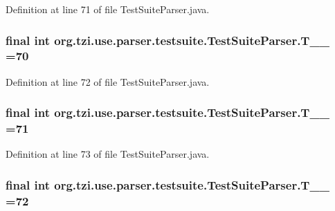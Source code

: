 Definition at line 71 of file Test\-Suite\-Parser.\-java.

\hypertarget{classorg_1_1tzi_1_1use_1_1parser_1_1testsuite_1_1_test_suite_parser_a0ce1b38ec15d81f404dbc935c9394cd3}{
\subsubsection[{T\-\_\-\-\_\-70}]{\setlength{\rightskip}{0pt plus 5cm}final int org.\-tzi.\-use.\-parser.\-testsuite.\-Test\-Suite\-Parser.\-T\-\_\-\-\_ =70\hspace{0.3cm}{\ttfamily [static]}}}\label{classorg_1_1tzi_1_1use_1_1parser_1_1testsuite_1_1_test_suite_parser_a0ce1b38ec15d81f404dbc935c9394cd3}


Definition at line 72 of file Test\-Suite\-Parser.\-java.

\hypertarget{classorg_1_1tzi_1_1use_1_1parser_1_1testsuite_1_1_test_suite_parser_a9903e3d5b461bff347486cb02d4a945e}{
\subsubsection[{T\-\_\-\-\_\-71}]{\setlength{\rightskip}{0pt plus 5cm}final int org.\-tzi.\-use.\-parser.\-testsuite.\-Test\-Suite\-Parser.\-T\-\_\-\-\_ =71\hspace{0.3cm}{\ttfamily [static]}}}\label{classorg_1_1tzi_1_1use_1_1parser_1_1testsuite_1_1_test_suite_parser_a9903e3d5b461bff347486cb02d4a945e}


Definition at line 73 of file Test\-Suite\-Parser.\-java.

\hypertarget{classorg_1_1tzi_1_1use_1_1parser_1_1testsuite_1_1_test_suite_parser_a76d3af36b56ea1386f613f98a185f88f}{
\subsubsection[{T\-\_\-\-\_\-72}]{\setlength{\rightskip}{0pt plus 5cm}final int org.\-tzi.\-use.\-parser.\-testsuite.\-Test\-Suite\-Parser.\-T\-\_\-\-\_ =72\hspace{0.3cm}{\ttfamily [static]}}}\label{classorg_1_1tzi_1_1use_1_1parser_1_1testsuite_1_1_test_suite_parser_a76d3af36b56ea1386f613f98a185f88f}


